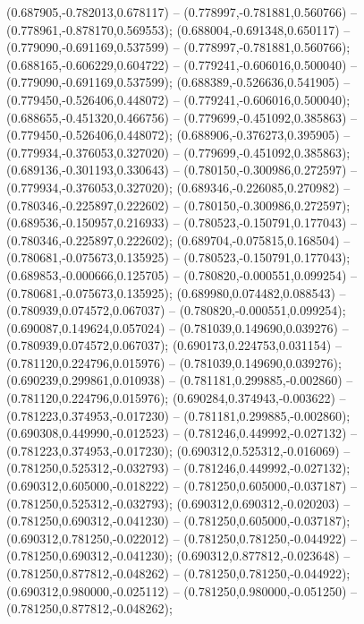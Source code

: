  (0.687905,-0.782013,0.678117) -- (0.778997,-0.781881,0.560766) -- (0.778961,-0.878170,0.569553);
 (0.688004,-0.691348,0.650117) -- (0.779090,-0.691169,0.537599) -- (0.778997,-0.781881,0.560766);
 (0.688165,-0.606229,0.604722) -- (0.779241,-0.606016,0.500040) -- (0.779090,-0.691169,0.537599);
 (0.688389,-0.526636,0.541905) -- (0.779450,-0.526406,0.448072) -- (0.779241,-0.606016,0.500040);
 (0.688655,-0.451320,0.466756) -- (0.779699,-0.451092,0.385863) -- (0.779450,-0.526406,0.448072);
 (0.688906,-0.376273,0.395905) -- (0.779934,-0.376053,0.327020) -- (0.779699,-0.451092,0.385863);
 (0.689136,-0.301193,0.330643) -- (0.780150,-0.300986,0.272597) -- (0.779934,-0.376053,0.327020);
 (0.689346,-0.226085,0.270982) -- (0.780346,-0.225897,0.222602) -- (0.780150,-0.300986,0.272597);
 (0.689536,-0.150957,0.216933) -- (0.780523,-0.150791,0.177043) -- (0.780346,-0.225897,0.222602);
 (0.689704,-0.075815,0.168504) -- (0.780681,-0.075673,0.135925) -- (0.780523,-0.150791,0.177043);
 (0.689853,-0.000666,0.125705) -- (0.780820,-0.000551,0.099254) -- (0.780681,-0.075673,0.135925);
 (0.689980,0.074482,0.088543) -- (0.780939,0.074572,0.067037) -- (0.780820,-0.000551,0.099254);
 (0.690087,0.149624,0.057024) -- (0.781039,0.149690,0.039276) -- (0.780939,0.074572,0.067037);
 (0.690173,0.224753,0.031154) -- (0.781120,0.224796,0.015976) -- (0.781039,0.149690,0.039276);
 (0.690239,0.299861,0.010938) -- (0.781181,0.299885,-0.002860) -- (0.781120,0.224796,0.015976);
 (0.690284,0.374943,-0.003622) -- (0.781223,0.374953,-0.017230) -- (0.781181,0.299885,-0.002860);
 (0.690308,0.449990,-0.012523) -- (0.781246,0.449992,-0.027132) -- (0.781223,0.374953,-0.017230);
 (0.690312,0.525312,-0.016069) -- (0.781250,0.525312,-0.032793) -- (0.781246,0.449992,-0.027132);
 (0.690312,0.605000,-0.018222) -- (0.781250,0.605000,-0.037187) -- (0.781250,0.525312,-0.032793);
 (0.690312,0.690312,-0.020203) -- (0.781250,0.690312,-0.041230) -- (0.781250,0.605000,-0.037187);
 (0.690312,0.781250,-0.022012) -- (0.781250,0.781250,-0.044922) -- (0.781250,0.690312,-0.041230);
 (0.690312,0.877812,-0.023648) -- (0.781250,0.877812,-0.048262) -- (0.781250,0.781250,-0.044922);
 (0.690312,0.980000,-0.025112) -- (0.781250,0.980000,-0.051250) -- (0.781250,0.877812,-0.048262);
